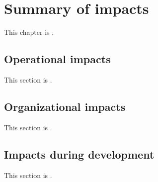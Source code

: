 
\chapter{Summary of impacts}
\label{loc:Summary of impacts}
% 

This chapter is \TBD.


\section{Operational impacts}
\label{loc:Operational impacts}
% 

This section is \TBD.


\section{Organizational impacts}
\label{loc:Organizational impacts}
% 

This section is \TBD.


\section{Impacts during development}
\label{loc:Impacts during development}
% 

This section is \TBD.
